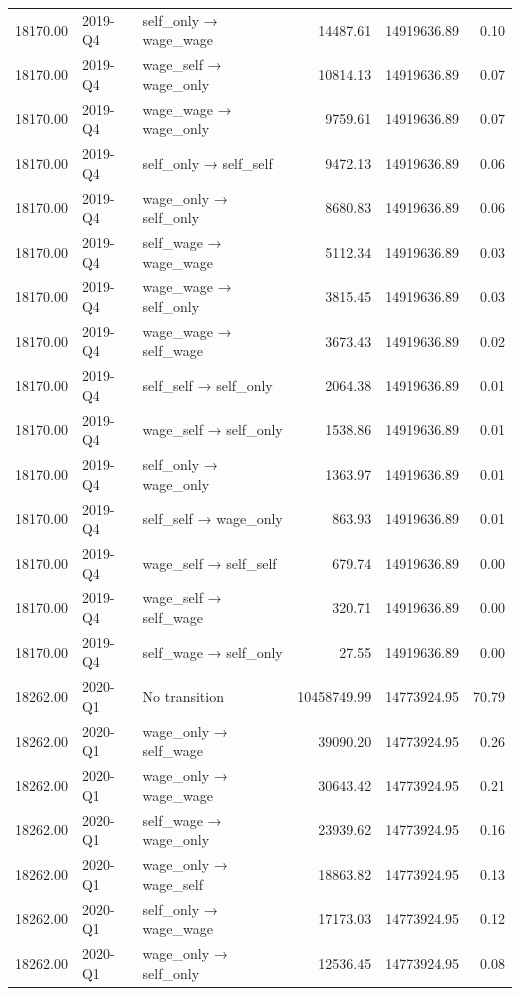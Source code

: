 \begin{table}[ht]
{\begin{tabular}{rllrrr}
  18170.00 & 2019-Q4 & self\_only → wage\_wage & 14487.61 & 14919636.89 & 0.10 \\ 
  18170.00 & 2019-Q4 & wage\_self → wage\_only & 10814.13 & 14919636.89 & 0.07 \\ 
  18170.00 & 2019-Q4 & wage\_wage → wage\_only & 9759.61 & 14919636.89 & 0.07 \\ 
  18170.00 & 2019-Q4 & self\_only → self\_self & 9472.13 & 14919636.89 & 0.06 \\ 
  18170.00 & 2019-Q4 & wage\_only → self\_only & 8680.83 & 14919636.89 & 0.06 \\ 
  18170.00 & 2019-Q4 & self\_wage → wage\_wage & 5112.34 & 14919636.89 & 0.03 \\ 
  18170.00 & 2019-Q4 & wage\_wage → self\_only & 3815.45 & 14919636.89 & 0.03 \\ 
  18170.00 & 2019-Q4 & wage\_wage → self\_wage & 3673.43 & 14919636.89 & 0.02 \\ 
  18170.00 & 2019-Q4 & self\_self → self\_only & 2064.38 & 14919636.89 & 0.01 \\ 
  18170.00 & 2019-Q4 & wage\_self → self\_only & 1538.86 & 14919636.89 & 0.01 \\ 
  18170.00 & 2019-Q4 & self\_only → wage\_only & 1363.97 & 14919636.89 & 0.01 \\ 
  18170.00 & 2019-Q4 & self\_self → wage\_only & 863.93 & 14919636.89 & 0.01 \\ 
  18170.00 & 2019-Q4 & wage\_self → self\_self & 679.74 & 14919636.89 & 0.00 \\ 
  18170.00 & 2019-Q4 & wage\_self → self\_wage & 320.71 & 14919636.89 & 0.00 \\ 
  18170.00 & 2019-Q4 & self\_wage → self\_only & 27.55 & 14919636.89 & 0.00 \\ 
  18262.00 & 2020-Q1 & No transition & 10458749.99 & 14773924.95 & 70.79 \\ 
  18262.00 & 2020-Q1 & wage\_only → self\_wage & 39090.20 & 14773924.95 & 0.26 \\ 
  18262.00 & 2020-Q1 & wage\_only → wage\_wage & 30643.42 & 14773924.95 & 0.21 \\ 
  18262.00 & 2020-Q1 & self\_wage → wage\_only & 23939.62 & 14773924.95 & 0.16 \\ 
  18262.00 & 2020-Q1 & wage\_only → wage\_self & 18863.82 & 14773924.95 & 0.13 \\ 
  18262.00 & 2020-Q1 & self\_only → wage\_wage & 17173.03 & 14773924.95 & 0.12 \\ 
  18262.00 & 2020-Q1 & wage\_only → self\_only & 12536.45 & 14773924.95 & 0.08 \\ 

\end{tabular}}
\end{table}
